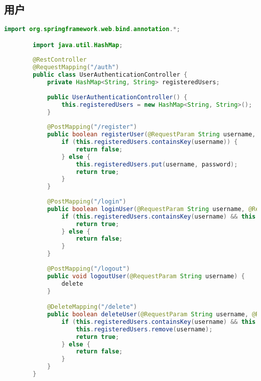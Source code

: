 \documentclass[UTF8]{ctexart}
\begin{document}
    \subsection{用户}
    \begin{lstlisting}[language=java]
        import org.springframework.web.bind.annotation.*;

        import java.util.HashMap;
        
        @RestController
        @RequestMapping("/auth")
        public class UserAuthenticationController {
            private HashMap<String, String> registeredUsers;
        
            public UserAuthenticationController() {
                this.registeredUsers = new HashMap<String, String>();
            }
        
            @PostMapping("/register")
            public boolean registerUser(@RequestParam String username, @RequestParam String password) {
                if (this.registeredUsers.containsKey(username)) {
                    return false;
                } else {
                    this.registeredUsers.put(username, password);
                    return true;
                }
            }
        
            @PostMapping("/login")
            public boolean loginUser(@RequestParam String username, @RequestParam String password) {
                if (this.registeredUsers.containsKey(username) && this.registeredUsers.get(username).equals(password)) {
                    return true;
                } else {
                    return false;
                }
            }
        
            @PostMapping("/logout")
            public void logoutUser(@RequestParam String username) {
                delete 
            }

            @DeleteMapping("/delete")
            public boolean deleteUser(@RequestParam String username, @RequestParam String password) {
                if (this.registeredUsers.containsKey(username) && this.registeredUsers.get(username).equals(password)) {
                    this.registeredUsers.remove(username);
                    return true;
                } else {
                    return false;
                }
            }
        }
    \end{lstlisting}
\end{document}
